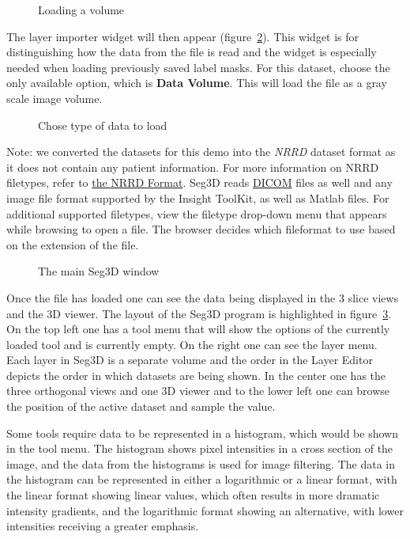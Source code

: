 \documentclass[fleqn,11pt,openany]{book}
\begin{document}
\begin{figure}
\caption{Loading a volume}\label{fig:LoadVolume}
\end{figure}

The layer importer widget will then appear (figure~\ref{fig:LoadVolume_2}).  This widget is for distinguishing how the data from the file is read and the widget is especially needed when loading previously saved label masks.  For this dataset, choose the only available option, which is \textbf {Data Volume}.  This will load the file as a gray scale image volume.  

\begin{figure}
\caption{Chose type of data to load}\label{fig:LoadVolume_2}
\end{figure}

Note: we converted the datasets for this demo into the {\em NRRD} dataset format as it does not contain any patient information. For more information on NRRD filetypes, refer to \href{http://teem.sourceforge.net/nrrd/format.html}{the NRRD Format}. Seg3D reads \href{http://en.wikipedia.org/wiki/DICOM}{DICOM} files as well and any image file format supported by the Insight ToolKit, as well as Matlab files. For additional supported filetypes, view the filetype drop-down menu that appears while browsing to open a file. The browser decides which fileformat to use based on the extension of the file.

\begin{figure}
\caption{The main Seg3D window}\label{fig:MainSeg3DWindow}
\end{figure}


Once the file has loaded one can see the data being displayed in the 3 slice views and the 3D viewer. The layout of the Seg3D program is highlighted in figure~\ref{fig:MainSeg3DWindow}. On the top left one has a tool menu that will show the options of the currently loaded tool and is currently empty. On the right one can see the layer menu. Each layer in Seg3D is a separate volume and the order in the Layer Editor depicts the order in which datasets are being shown. In the center one has the three orthogonal views and one 3D viewer and to the lower left one can browse the position of the active dataset and sample the value.


Some tools require data to be represented in a histogram, which would be shown in the tool menu. The histogram shows pixel intensities in a cross section of the image, and the data from the histograms is used for image filtering. The data in the histogram can be represented in either a logarithmic or a linear format, with the linear format showing linear values, which often results in more dramatic intensity gradients, and the logarithmic format showing an alternative, with lower intensities receiving a greater emphasis.
\end{document}
